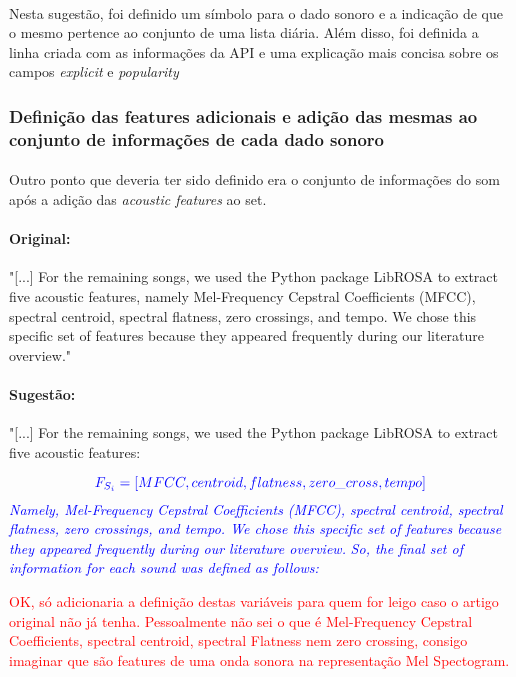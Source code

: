 \documentclass{article}
\begin{document}
\paragraph{}
Nesta sugestão, foi definido um símbolo para o dado sonoro e a indicação de que o mesmo pertence ao conjunto de uma lista diária. Além disso, foi definida a linha criada com as informações da API e uma explicação mais concisa sobre os campos \textit{explicit} e \textit{popularity}

\subsubsection{Definição das features adicionais e adição das mesmas ao conjunto de informações de cada dado sonoro}
\paragraph{}
Outro ponto que deveria ter sido definido era o conjunto de informações do som após a adição das \textit{acoustic features} ao set.

\paragraph{Original: }
"[...] For the remaining songs, we used the Python package LibROSA to extract five acoustic features, namely Mel-Frequency Cepstral Coefficients (MFCC), spectral centroid, spectral flatness, zero crossings, and tempo. We chose this specific set of features because they appeared frequently during our literature overview."

\paragraph{Sugestão: }
"[...] For the remaining songs, we used the Python package LibROSA to extract five acoustic features: 

\[
\textcolor{blue} {\textit{
\(
F_{S_{i}} = [MFCC, centroid, flatness, zero\_cross, tempo]
\)
}}
\]
\textcolor{blue} {\textit{
Namely, Mel-Frequency Cepstral Coefficients (MFCC), spectral centroid, spectral flatness, zero crossings, and tempo. We chose this specific set of features because they appeared frequently during our literature overview.
}}
\textcolor{blue} {\textit{
So, the final set of information for each sound was defined as follows:
}}

\textcolor{red}{OK, só adicionaria a definição destas variáveis para quem for leigo caso o artigo original não já tenha. Pessoalmente não sei o que é Mel-Frequency Cepstral Coefficients, spectral centroid, spectral Flatness nem zero crossing, consigo imaginar que são features de uma onda sonora na representação Mel Spectogram.}
\end{document}
